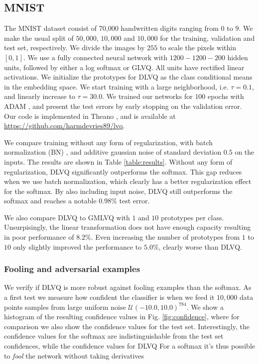 \documentclass{esannV2}
\begin{document}
\subsection{MNIST}
The MNIST dataset consist of 70,000 handwritten digits ranging from $0$ to $9$. We make the usual split of $50,000$, $10,000$ and $10,000$ for the training, validation and test set, respectively. We divide the images by $255$ to scale the pixels within $[0, 1]$.  We use a fully connected neural network with $1200-1200-200$ hidden units, followed by either a log softmax or GLVQ. All units have rectified linear activations. We initialize the prototypes for DLVQ as the class conditional means in the embedding space. We start training with a large neighborhood, i.e. $\tau=0.1$, and linearly increase to $\tau=30.0$. 
We trained our networks for $100$ epochs with ADAM \cite{DBLP:journals/corr/KingmaB14}, and present the test errors by early stopping on the validation error.  
Our code is implemented in Theano \cite{Bastien-Theano-2012}, and is available at \url{https://github.com/harmdevries89/lvq}. 


We compare training without any form of regularization, with batch normalization (BN) \cite{DBLP:journals/corr/IoffeS15}, and additive gaussian noise of standard deviation $0.5$ on the inputs. The results are shown in Table \ref{table:results}. Without any form of regularization, DLVQ significantly outperforms the softmax. This gap reduces when we use batch normalization, which clearly has a better regularization effect for the softmax. By also including input noise, DLVQ still outperforms the softmax and reaches a notable $0.98\%$ test error. 

We also compare DLVQ to GMLVQ with $1$ and $10$ prototypes per class. Unsurpisingly, the linear transformation does not have enough capacity resulting in poor performance of $8.2\%$. Even increasing the number of prototypes from $1$ to $10$ only slightly improved the performance to $5.0\%$, clearly worse than DLVQ. 

\subsubsection{Fooling and adversarial examples}
We verify if DLVQ is more robust against fooling examples than the softmax. As a first test we measure how confident the classifier is when we feed it $10,000$ data points samples from large uniform noise $\mathcal{U}(-10.0, 10.0)^{784}$. We show a histogram of the resulting confidence values in Fig. \ref{fig:confidence}, where for comparison we also show the confidence values for the test set. Interestingly, the confidence values for the softmax are indistinguishable from the test set confidences, while the confidence values for DLVQ For a softmax it's thus possible to \emph{fool} the network without taking derivatives  
\end{document}
